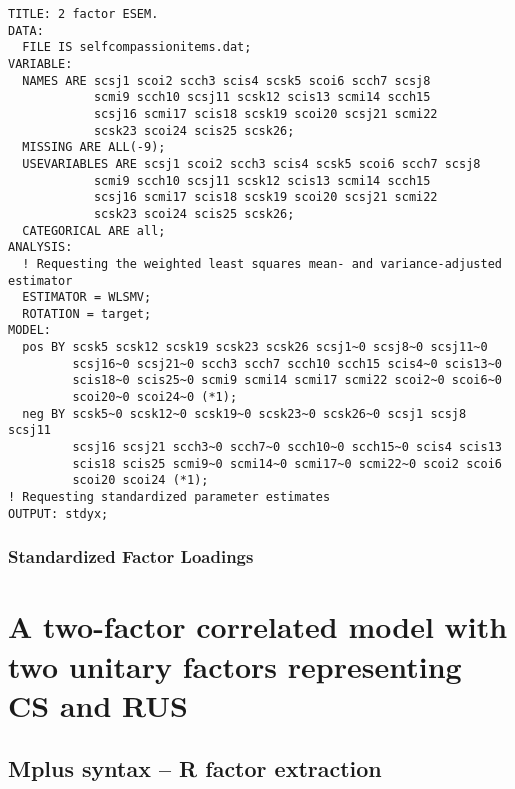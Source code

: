 \documentclass[aps,floatfix,prl]{revtex4}
\begin{document}
\begin{verbatim}
TITLE: 2 factor ESEM.
DATA:
  FILE IS selfcompassionitems.dat;
VARIABLE:
  NAMES ARE scsj1 scoi2 scch3 scis4 scsk5 scoi6 scch7 scsj8 
            scmi9 scch10 scsj11 scsk12 scis13 scmi14 scch15 
            scsj16 scmi17 scis18 scsk19 scoi20 scsj21 scmi22 
            scsk23 scoi24 scis25 scsk26; 
  MISSING ARE ALL(-9);
  USEVARIABLES ARE scsj1 scoi2 scch3 scis4 scsk5 scoi6 scch7 scsj8 
            scmi9 scch10 scsj11 scsk12 scis13 scmi14 scch15 
            scsj16 scmi17 scis18 scsk19 scoi20 scsj21 scmi22 
            scsk23 scoi24 scis25 scsk26; 
  CATEGORICAL ARE all;
ANALYSIS:
  ! Requesting the weighted least squares mean- and variance-adjusted estimator
  ESTIMATOR = WLSMV;
  ROTATION = target;
MODEL:
  pos BY scsk5 scsk12 scsk19 scsk23 scsk26 scsj1~0 scsj8~0 scsj11~0 
         scsj16~0 scsj21~0 scch3 scch7 scch10 scch15 scis4~0 scis13~0 
         scis18~0 scis25~0 scmi9 scmi14 scmi17 scmi22 scoi2~0 scoi6~0 
         scoi20~0 scoi24~0 (*1);
  neg BY scsk5~0 scsk12~0 scsk19~0 scsk23~0 scsk26~0 scsj1 scsj8 scsj11 
         scsj16 scsj21 scch3~0 scch7~0 scch10~0 scch15~0 scis4 scis13 
         scis18 scis25 scmi9~0 scmi14~0 scmi17~0 scmi22~0 scoi2 scoi6 
         scoi20 scoi24 (*1);
! Requesting standardized parameter estimates
OUTPUT: stdyx;
\end{verbatim}

\newpage


\subsubsection{Standardized Factor
Loadings}\label{standardized-factor-loadings}



\newpage

\hypertarget{a-two-factor-correlated-model-with-two-unitary-factors-representing-cs-and-rus-1}{%
\section{A two-factor correlated model with two unitary factors
representing CS and
RUS}\label{a-two-factor-correlated-model-with-two-unitary-factors-representing-cs-and-rus-1}}

\hypertarget{mplus-syntax-r-factor-extraction}{%
\subsection{Mplus syntax -- R factor
extraction}\label{mplus-syntax-r-factor-extraction}}
\end{document}
